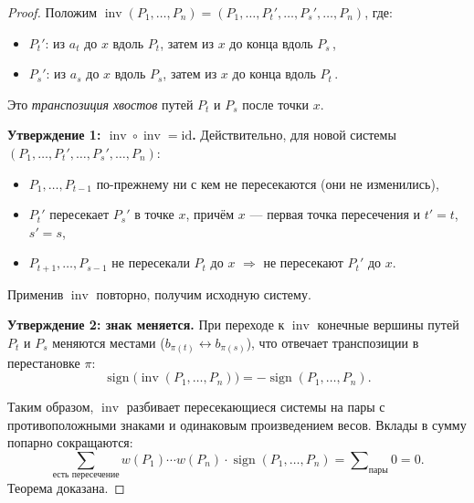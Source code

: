 \begin{proof}
	Положим $\operatorname{inv}(P_1,\ldots,P_n) = (P_1,\ldots,P_t',\ldots,P_s',\ldots,P_n)$, где:
	\begin{itemize}
		\item $P_t'$: из $a_t$ до $x$ вдоль $P_t$, затем из $x$ до конца вдоль $P_s$\,,
		\item $P_s'$: из $a_s$ до $x$ вдоль $P_s$, затем из $x$ до конца вдоль $P_t$\,.
	\end{itemize}
	Это \emph{транспозиция хвостов} путей $P_t$ и $P_s$ после точки $x$.
	
	\medskip
	\textbf{Утверждение 1: $\operatorname{inv}\circ\operatorname{inv} = \mathrm{id}$.}
	Действительно, для новой системы $(P_1,\ldots,P_t',\ldots,P_s',\ldots,P_n)$:
	\begin{itemize}
		\item $P_1,\ldots,P_{t-1}$ по-прежнему ни с кем не пересекаются (они не изменились),
		\item $P_t'$ пересекает $P_s'$ в точке $x$, причём $x$ — первая точка пересечения и $t' = t$, $s' = s$,
		\item $P_{t+1},\ldots,P_{s-1}$ не пересекали $P_t$ до $x$ $\Rightarrow$ не пересекают $P_t'$ до $x$.
	\end{itemize}
	Применив $\operatorname{inv}$ повторно, получим исходную систему.
	
	\medskip
	\textbf{Утверждение 2: знак меняется.}
	При переходе к $\operatorname{inv}$ конечные вершины путей $P_t$ и $P_s$ меняются местами
	($b_{\pi(t)} \leftrightarrow b_{\pi(s)}$), что отвечает транспозиции в перестановке $\pi$:
	\[
	\operatorname{sign}\!\bigl(\operatorname{inv}(P_1,\ldots,P_n)\bigr) = -\operatorname{sign}(P_1,\ldots,P_n).
	\]
	
	Таким образом, $\operatorname{inv}$ разбивает пересекающиеся системы на пары с противоположными
	знаками и одинаковым произведением весов. Вклады в сумму попарно сокращаются:
	\[
	\sum_{\text{есть пересечение}}
	w(P_1)\cdots w(P_n)\cdot\operatorname{sign}(P_1,\ldots,P_n) = \sum\nolimits_{\text{пары}} 0 = 0.
	\]
	Теорема доказана.
\end{proof}